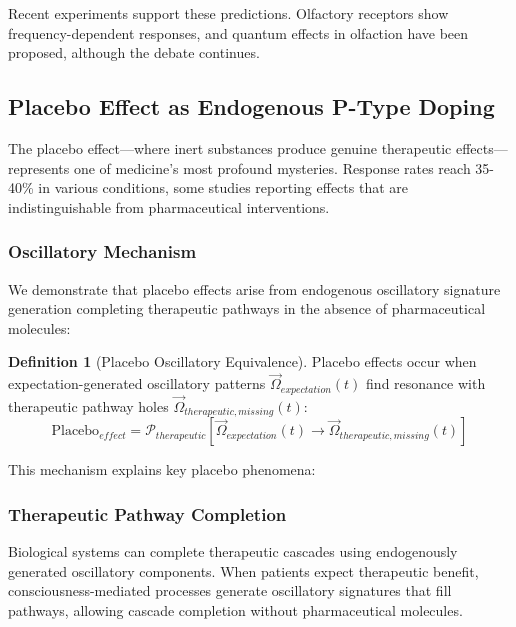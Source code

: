 \documentclass{article}
\theoremstyle{definition}
\newtheorem{definition}[theorem]{Definition}
\theoremstyle{remark}
\begin{document}
Recent experiments support these predictions. Olfactory receptors show frequency-dependent responses\cite{Haddad2008}, and quantum effects in olfaction have been proposed\cite{Turin1996,Franco2011}, although the debate continues\cite{Keller2004}.

\subsection{Placebo Effect as Endogenous P-Type Doping}

The placebo effect—where inert substances produce genuine therapeutic effects—represents one of medicine's most profound mysteries. Response rates reach 35-40\% in various conditions\cite{Benedetti2008,Enck2013}, some studies reporting effects that are indistinguishable from pharmaceutical interventions\cite{Kaptchuk2008}.

\subsubsection{Oscillatory Mechanism}

We demonstrate that placebo effects arise from endogenous oscillatory signature generation completing therapeutic pathways in the absence of pharmaceutical molecules:

\begin{definition}[Placebo Oscillatory Equivalence]
Placebo effects occur when expectation-generated oscillatory patterns $\vec{\Omega}_{expectation}(t)$ find resonance with therapeutic pathway holes $\vec{\Omega}_{therapeutic,missing}(t)$:
\begin{equation}
\text{Placebo}_{effect} = \mathcal{P}_{therapeutic}[\vec{\Omega}_{expectation}(t) \rightarrow \vec{\Omega}_{therapeutic,missing}(t)]
\label{eq:placebo_mechanism}
\end{equation}
\end{definition}

This mechanism explains key placebo phenomena:

\subsubsection{Therapeutic Pathway Completion}

Biological systems can complete therapeutic cascades using endogenously generated oscillatory components. When patients expect therapeutic benefit, consciousness-mediated processes generate oscillatory signatures that fill pathways, allowing cascade completion without pharmaceutical molecules.
\end{document}
